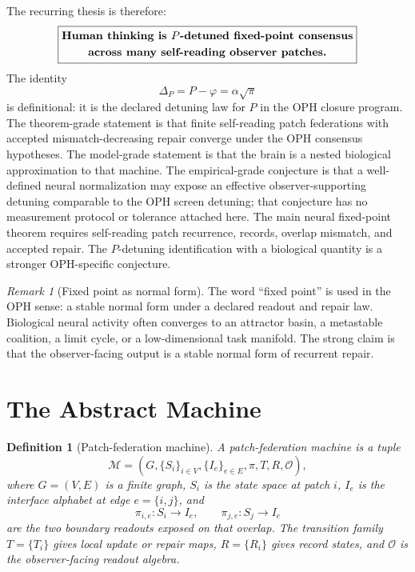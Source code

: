 \documentclass[11pt]{article}
\newtheorem{definition}[theorem]{Definition}
\theoremstyle{remark}
\newtheorem{remark}[theorem]{Remark}
\theoremstyle{plain}
\begin{document}
The recurring thesis is therefore:
\[
\boxed{
\begin{gathered}
\text{\bfseries Human thinking is }P\text{\bfseries -detuned fixed-point consensus}\\
\text{\bfseries across many self-reading observer patches.}
\end{gathered}
}
\]
The identity
\[
\Delta_P=P-\varphi=\alpha\sqrt{\pi}
\]
is definitional: it is the declared detuning law for \(P\) in the OPH closure
program. The theorem-grade statement is that finite self-reading patch
federations with accepted mismatch-decreasing repair converge under the OPH
consensus hypotheses. The model-grade statement is that the brain is a nested
biological approximation to that machine. The empirical-grade conjecture is
that a well-defined neural normalization may expose an effective
observer-supporting detuning comparable to the OPH screen detuning; that
conjecture has no measurement protocol or tolerance attached here.
The main neural fixed-point theorem requires self-reading patch recurrence, records, overlap mismatch, and accepted repair. The \(P\)-detuning identification with a biological quantity is a stronger OPH-specific conjecture.

\begin{remark}[Fixed point as normal form]
The word ``fixed point'' is used in the OPH sense: a stable normal form under a declared readout and repair law. Biological neural activity often converges to an attractor basin, a metastable coalition, a limit cycle, or a low-dimensional task manifold. The strong claim is that the observer-facing output is a stable normal form of recurrent repair.
\end{remark}

\section{The Abstract Machine}

\begin{definition}[Patch-federation machine]
A patch-federation machine is a tuple
\[
\mathcal M=(G,\{S_i\}_{i\in V},\{I_e\}_{e\in E},\pi,T,R,\mathcal O),
\]
where \(G=(V,E)\) is a finite graph, \(S_i\) is the state space at patch \(i\), \(I_e\) is the interface alphabet at edge \(e=\{i,j\}\), and
\[
\pi_{i,e}:S_i\to I_e,\qquad \pi_{j,e}:S_j\to I_e
\]
are the two boundary readouts exposed on that overlap. The transition family \(T=\{T_i\}\) gives local update or repair maps, \(R=\{R_i\}\) gives record states, and \(\mathcal O\) is the observer-facing readout algebra.
\end{definition}
\end{document}
